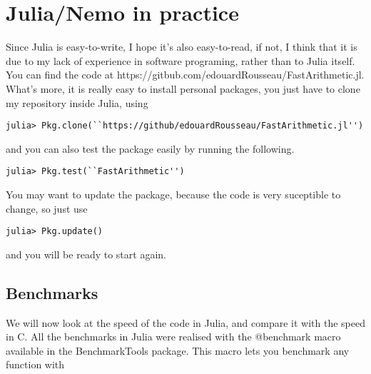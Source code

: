 \documentclass[a4paper,11pt]{article}
\theoremstyle{break}
\theoremstyle{definition}
\theoremstyle{remark}
\begin{document}
\section{Julia/Nemo in practice}
Since Julia is easy-to-write, I hope it's also
easy-to-read, if not, I think that it is due to my lack of experience in
software programing, rather than to Julia itself. You can find the code
at
https://gitbub.com/edouardRousseau/FastArithmetic.jl. What's more, it is really
easy to install personal packages, you just have to clone my repository
inside Julia, using
\begin{verbatim}
julia> Pkg.clone(``https://github/edouardRousseau/FastArithmetic.jl'') 
\end{verbatim}
and you can also test the package easily by running the following.
\begin{verbatim}
julia> Pkg.test(``FastArithmetic'') 
\end{verbatim}
You may want to update the package, because the code is very suceptible to change, so just use
\begin{verbatim}
julia> Pkg.update()
\end{verbatim}
and you will be ready to start again. 
\subsection{Benchmarks}
We will now look at the speed of the code in Julia, and compare it with
the speed in C. All the benchmarks in Julia were realised with the
@benchmark macro available in the BenchmarkTools package. This macro lets you
benchmark any function with 
\end{document}
